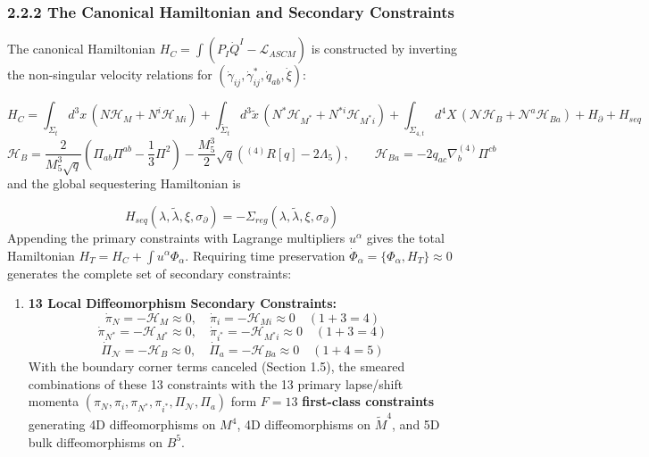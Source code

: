 \documentclass[aps,prd,onecolumn,superscriptaddress,nofootinbib,longbibliography,10pt]{revtex4-2}
\begin{document}
{{\begin{enumerate}
\end{enumerate}


  
\subsubsection*{2.2.2 The Canonical Hamiltonian and Secondary Constraints}

  The canonical Hamiltonian \(H_C = \int \left(P_I\dot{Q}^I - \mathcal{L}_{ASCM}\right)\) is constructed by inverting the non-singular velocity relations for \((\dot{\gamma}_{ij}, \dot{\gamma}^*_{ij}, \dot{q}_{ab}, \dot{\xi})\):


  \[ H_C = \int_{\Sigma_t} d^3x\,(N\mathcal{H}_M + N^i\mathcal{H}_{Mi}) + \int_{\tilde{\Sigma}_t} d^3\tilde{x}\,(N^*\mathcal{H}_{M^*} + N^{*i}\mathcal{H}_{M^*i}) + \int_{\Sigma_{4,t}} d^4X\,(\mathcal{N}\mathcal{H}_B + \mathcal{N}^a\mathcal{H}_{Ba}) + H_\partial + H_{seq} \]
\[\mathcal{H}_B = \frac{2}{M_5^3\sqrt{q}}\left(\Pi_{ab}\Pi^{ab} - \frac{1}{3}\Pi^2\right) - \frac{M_5^3}{2}\sqrt{q}\left(^{(4)}R[q] - 2\Lambda_5\right), \qquad \mathcal{H}_{Ba} = -2q_{ac}\nabla^{(4)}_b\Pi^{cb}\]
and the global sequestering Hamiltonian is


  \[ H_{seq}(\lambda,\tilde{\lambda},\xi,\sigma_\partial) = -\Sigma_{reg}(\lambda,\tilde{\lambda},\xi,\sigma_\partial) \]
  Appending the primary constraints with Lagrange multipliers \(u^\alpha\) gives the total Hamiltonian \(H_T = H_C + \int u^\alpha \Phi_\alpha\). Requiring time preservation \(\dot{\Phi}_\alpha = \{\Phi_\alpha, H_T\} \approx 0\) generates the complete set of secondary constraints:


  
\begin{enumerate}
    
\item \textbf{13 Local Diffeomorphism Secondary Constraints:}
    \[ \dot{\pi}_N = -\mathcal{H}_M \approx 0, \quad \dot{\pi}_i = -\mathcal{H}_{Mi} \approx 0 \quad (1 + 3 = 4) \]
    \[ \dot{\pi}_{N^*} = -\mathcal{H}_{M^*} \approx 0, \quad \dot{\pi}_{i^*} = -\mathcal{H}_{M^*i} \approx 0 \quad (1 + 3 = 4) \]
    \[ \dot{\Pi}_{\mathcal{N}} = -\mathcal{H}_B \approx 0, \quad \dot{\Pi}_a = -\mathcal{H}_{Ba} \approx 0 \quad (1 + 4 = 5) \]
    With the boundary corner terms canceled (Section 1.5), the smeared combinations of these 13 constraints with the 13 primary lapse/shift momenta \((\pi_N, \pi_i, \pi_{N^*}, \pi_{i^*}, \Pi_{\mathcal{N}}, \Pi_a)\) form \(F = 13\) \textbf{first-class constraints} generating 4D diffeomorphisms on \(M^4\), 4D diffeomorphisms on \(\tilde{M}^4\), and 5D bulk diffeomorphisms on \(B^5\).
    

\end{enumerate}}}
\end{document}
